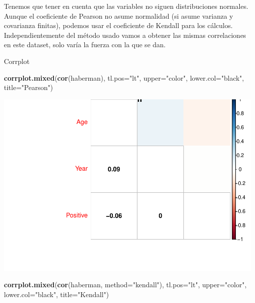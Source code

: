 \documentclass[
]{article}
\newenvironment{Shaded}{\begin{snugshade}}{\end{snugshade}}
\newcommand{\DataTypeTok}[1]{\textcolor[rgb]{0.13,0.29,0.53}{#1}}
\newcommand{\KeywordTok}[1]{\textcolor[rgb]{0.13,0.29,0.53}{\textbf{#1}}}
\newcommand{\NormalTok}[1]{#1}
\newcommand{\StringTok}[1]{\textcolor[rgb]{0.31,0.60,0.02}{#1}}
\begin{document}
Tenemos que tener en cuenta que las variables no siguen distribuciones
normales. Aunque el coeficiente de Pearson no asume normalidad (si asume
varianza y covarianza finitas), podemos usar el coeficiente de Kendall
para los cálculos. Independientemente del método usado vamos a obtener
las mismas correlaciones en este dataset, solo varía la fuerza con la
que se dan.

Corrplot

\begin{Shaded}
\begin{Highlighting}[]
\KeywordTok{corrplot.mixed}\NormalTok{(}\KeywordTok{cor}\NormalTok{(haberman), }\DataTypeTok{tl.pos=}\StringTok{"lt"}\NormalTok{, }\DataTypeTok{upper=}\StringTok{"color"}\NormalTok{, }\DataTypeTok{lower.col=}\StringTok{"black"}\NormalTok{, }\DataTypeTok{title=}\StringTok{"Pearson"}\NormalTok{)}
\end{Highlighting}
\end{Shaded}

\begin{center}\includegraphics{EDA2_files/figure-latex/unnamed-chunk-27-1} \end{center}

\begin{Shaded}
\begin{Highlighting}[]
\KeywordTok{corrplot.mixed}\NormalTok{(}\KeywordTok{cor}\NormalTok{(haberman, }\DataTypeTok{method=}\StringTok{"kendall"}\NormalTok{), }\DataTypeTok{tl.pos=}\StringTok{"lt"}\NormalTok{, }\DataTypeTok{upper=}\StringTok{"color"}\NormalTok{, }\DataTypeTok{lower.col=}\StringTok{"black"}\NormalTok{, }\DataTypeTok{title=}\StringTok{"Kendall"}\NormalTok{)}
\end{Highlighting}
\end{Shaded}
\end{document}
